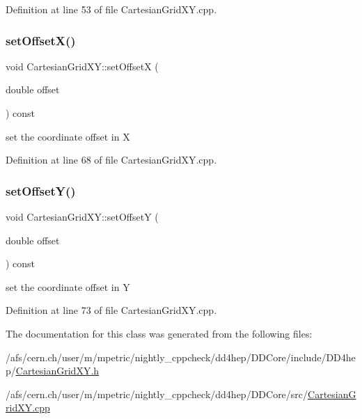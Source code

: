 Definition at line 53 of file Cartesian\+Grid\+X\+Y.\+cpp.

\hypertarget{class_d_d4hep_1_1_geometry_1_1_cartesian_grid_x_y_afc2c6ca73a3ec619dcd0ed02b5da7320}{}\label{class_d_d4hep_1_1_geometry_1_1_cartesian_grid_x_y_afc2c6ca73a3ec619dcd0ed02b5da7320} 
\subsubsection{\texorpdfstring{set\+Offset\+X()}{setOffsetX()}}
{\footnotesize\ttfamily void Cartesian\+Grid\+X\+Y\+::set\+OffsetX (\begin{DoxyParamCaption}\item[{double}]{offset }\end{DoxyParamCaption}) const}



set the coordinate offset in X 



Definition at line 68 of file Cartesian\+Grid\+X\+Y.\+cpp.

\hypertarget{class_d_d4hep_1_1_geometry_1_1_cartesian_grid_x_y_a24cf22e1d6707cc54a3484c42d58b283}{}\label{class_d_d4hep_1_1_geometry_1_1_cartesian_grid_x_y_a24cf22e1d6707cc54a3484c42d58b283} 
\subsubsection{\texorpdfstring{set\+Offset\+Y()}{setOffsetY()}}
{\footnotesize\ttfamily void Cartesian\+Grid\+X\+Y\+::set\+OffsetY (\begin{DoxyParamCaption}\item[{double}]{offset }\end{DoxyParamCaption}) const}



set the coordinate offset in Y 



Definition at line 73 of file Cartesian\+Grid\+X\+Y.\+cpp.



The documentation for this class was generated from the following files\+:\begin{DoxyCompactItemize}
\item 
/afs/cern.\+ch/user/m/mpetric/nightly\+\_\+cppcheck/dd4hep/\+D\+D\+Core/include/\+D\+D4hep/\hyperlink{_d_d_core_2include_2_d_d4hep_2_cartesian_grid_x_y_8h}{Cartesian\+Grid\+X\+Y.\+h}\item 
/afs/cern.\+ch/user/m/mpetric/nightly\+\_\+cppcheck/dd4hep/\+D\+D\+Core/src/\hyperlink{_d_d_core_2src_2_cartesian_grid_x_y_8cpp}{Cartesian\+Grid\+X\+Y.\+cpp}\end{DoxyCompactItemize}
